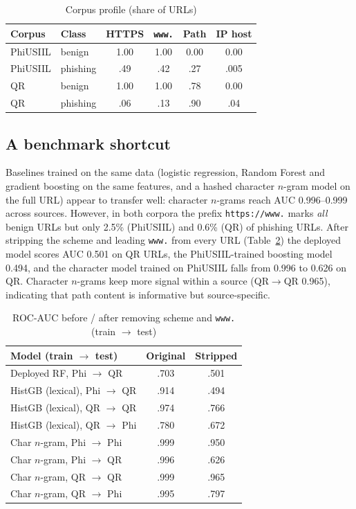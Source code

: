 \documentclass[conference]{IEEEtran}
\begin{document}
\begin{table}[t]
\caption{Corpus profile (share of URLs)}
\label{tab:prof}
\centering
\small
\begin{tabular}{llcccc}
\toprule
Corpus & Class & HTTPS & \texttt{www.} & Path & IP host \\
\midrule
PhiUSIIL & benign & 1.00 & 1.00 & 0.00 & 0.00 \\
PhiUSIIL & phishing & .49 & .42 & .27 & .005 \\
QR & benign & 1.00 & 1.00 & .78 & 0.00 \\
QR & phishing & .06 & .13 & .90 & .04 \\
\bottomrule
\end{tabular}
\end{table}

\subsection{A benchmark shortcut}\label{sec:res-shortcut}
Baselines trained on the same data (logistic regression, Random Forest and gradient boosting on the same features, and a hashed character $n$-gram model on the full URL) appear to transfer well: character $n$-grams reach AUC 0.996--0.999 across sources. However, in both corpora the prefix \texttt{https://www.} marks \emph{all} benign URLs but only 2.5\% (PhiUSIIL) and 0.6\% (QR) of phishing URLs. After stripping the scheme and leading \texttt{www.} from every URL (Table~\ref{tab:base}) the deployed model scores AUC 0.501 on QR URLs, the PhiUSIIL-trained boosting model 0.494, and the character model trained on PhiUSIIL falls from 0.996 to 0.626 on QR. Character $n$-grams keep more signal within a source (QR$\rightarrow$QR 0.965), indicating that path content is informative but source-specific.

\begin{table}[t]
\caption{ROC-AUC before / after removing scheme and \texttt{www.} (train $\rightarrow$ test)}
\label{tab:base}
\centering
\small
\begin{tabular}{lcc}
\toprule
Model (train $\rightarrow$ test) & Original & Stripped \\
\midrule
Deployed RF, Phi $\rightarrow$ QR & .703 & .501 \\
HistGB (lexical), Phi $\rightarrow$ QR & .914 & .494 \\
HistGB (lexical), QR $\rightarrow$ QR & .974 & .766 \\
HistGB (lexical), QR $\rightarrow$ Phi & .780 & .672 \\
Char $n$-gram, Phi $\rightarrow$ Phi & .999 & .950 \\
Char $n$-gram, Phi $\rightarrow$ QR & .996 & .626 \\
Char $n$-gram, QR $\rightarrow$ QR & .999 & .965 \\
Char $n$-gram, QR $\rightarrow$ Phi & .995 & .797 \\
\bottomrule
\end{tabular}
\end{table}
\end{document}
